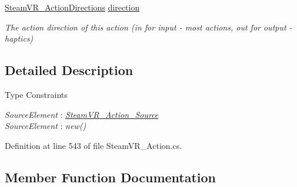 \begin{DoxyCompactItemize}
\mbox{\hyperlink{namespace_valve_1_1_v_r_a1e6192cb5ddaf204afab87ccb5728780}{Steam\+V\+R\+\_\+\+Action\+Directions}} \mbox{\hyperlink{class_valve_1_1_v_r_1_1_steam_v_r___action___source___map_a905ff9619f4ff10696ac1ebff4d5d574}{direction}}
\begin{DoxyCompactList}\small\item\em The action direction of this action (in for input -\/ most actions, out for output -\/ haptics) \end{DoxyCompactList}\end{DoxyCompactItemize}


\subsection{Detailed Description}
\begin{Desc}
\item[Type Constraints]\begin{description}
\item[{\em Source\+Element} : {\em \mbox{\hyperlink{class_valve_1_1_v_r_1_1_steam_v_r___action___source}{Steam\+V\+R\+\_\+\+Action\+\_\+\+Source}}}]\item[{\em Source\+Element} : {\em new()}]\end{description}
\end{Desc}


Definition at line 543 of file Steam\+V\+R\+\_\+\+Action.\+cs.



\subsection{Member Function Documentation}
\mbox{\label{class_valve_1_1_v_r_1_1_steam_v_r___action___source___map_a31d4929590d0a63ae7693b87424e9990}} 
